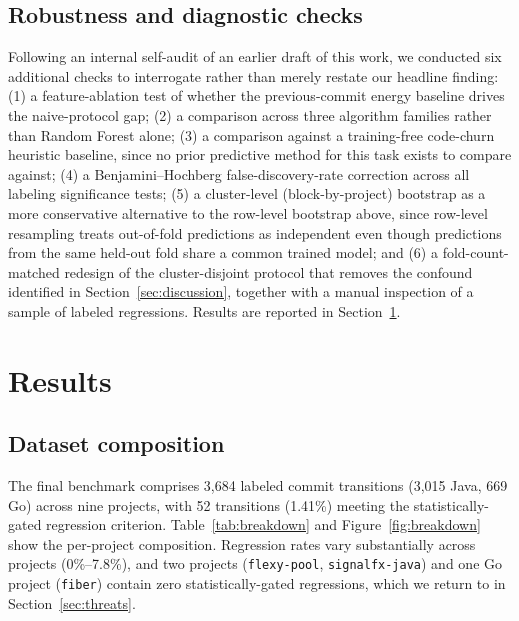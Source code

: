 \documentclass[preprint,12pt]{elsarticle}
\begin{document}
\subsection{Robustness and diagnostic checks}
\label{sec:robustness}
Following an internal self-audit of an earlier draft of this work, we conducted six additional checks to interrogate rather than merely restate our headline finding: (1) a feature-ablation test of whether the previous-commit energy baseline drives the naive-protocol gap; (2) a comparison across three algorithm families rather than Random Forest alone; (3) a comparison against a training-free code-churn heuristic baseline, since no prior predictive method for this task exists to compare against; (4) a Benjamini--Hochberg false-discovery-rate correction across all labeling significance tests; (5) a cluster-level (block-by-project) bootstrap as a more conservative alternative to the row-level bootstrap above, since row-level resampling treats out-of-fold predictions as independent even though predictions from the same held-out fold share a common trained model; and (6) a fold-count-matched redesign of the cluster-disjoint protocol that removes the confound identified in Section~\ref{sec:discussion}, together with a manual inspection of a sample of labeled regressions. Results are reported in Section~\ref{sec:results}.

\section{Results}
\label{sec:results}

\subsection{Dataset composition}
The final benchmark comprises 3{,}684 labeled commit transitions (3{,}015 Java, 669 Go) across nine projects, with 52 transitions (1.41\%) meeting the statistically-gated regression criterion. Table~\ref{tab:breakdown} and Figure~\ref{fig:breakdown} show the per-project composition. Regression rates vary substantially across projects (0\%--7.8\%), and two projects (\texttt{flexy-pool}, \texttt{signalfx-java}) and one Go project (\texttt{fiber}) contain zero statistically-gated regressions, which we return to in Section~\ref{sec:threats}.
\end{document}
